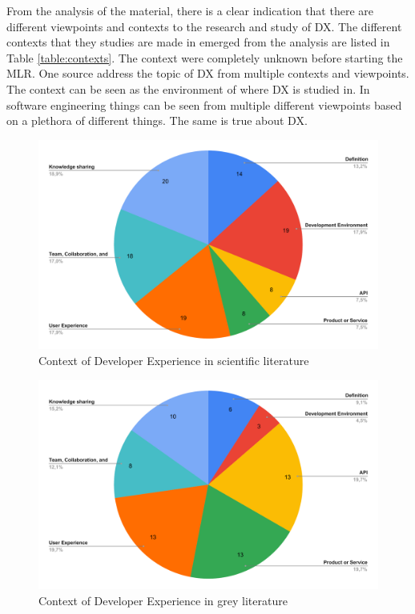 \documentclass[english, 12pt, a4paper, sci, utf8, a-1b, online]{aaltothesis}
\begin{document}
From the analysis of the material, there is a clear indication that there are different viewpoints and contexts to the research and study of DX. The different contexts that they studies are made in emerged from the analysis are listed in Table \ref{table:contexts}. The context were completely unknown before starting the MLR. One source address the topic of DX from multiple contexts and viewpoints. The context can be seen as the environment of where DX is studied in. In software engineering things can be seen from multiple different viewpoints based on a plethora of different things. The same is true about DX.

\begin{figure}[h]
  \begin{center}
    \includegraphics[width=\textwidth]{context-scientific.pdf}
    \captionsetup{width=0.6\textwidth}
    \caption{Context of Developer Experience in scientific literature}
  \end{center}
\end{figure}

\begin{figure}[h]
  \begin{center}
    \includegraphics[width=\textwidth]{context-grey.pdf}
    \captionsetup{width=0.6\textwidth}
    \caption{Context of Developer Experience in grey literature}
  \end{center}
\end{figure}
\end{document}
